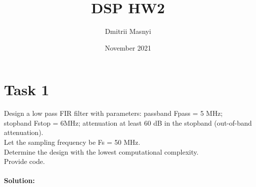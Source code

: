 \documentclass[16pt]{report}
\title{DSP HW2}
\author{Dmitrii Masnyi}
\date{November 2021}
\begin{document}
\maketitle
\section*{Task 1}
Design a low pass FIR filter with parameters: passband Fpass = 5 MHz; stopband Fstop = 6MHz; attenuation at least 60 dB in the stopband (out-of-band attenuation). \\
Let the sampling frequency be Fs = 50 MHz.\\
Determine the design with the lowest computational complexity. \\ 
Provide code. \\ \\
\textbf{Solution:} 
\end{document}
